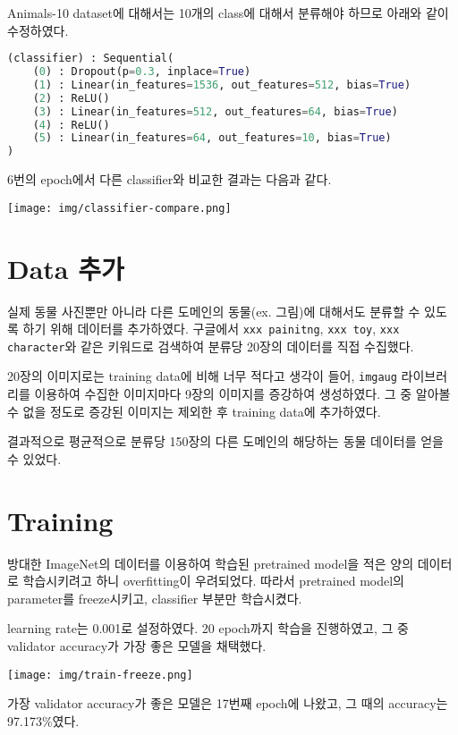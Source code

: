 Animals-10 dataset에 대해서는 10개의 class에 대해서 분류해야 하므로 아래와 같이 수정하였다.
\begin{lstlisting}[language=Python]
(classifier) : Sequential(
    (0) : Dropout(p=0.3, inplace=True)
    (1) : Linear(in_features=1536, out_features=512, bias=True)
    (2) : ReLU()
    (3) : Linear(in_features=512, out_features=64, bias=True)
    (4) : ReLU()
    (5) : Linear(in_features=64, out_features=10, bias=True)
) 
\end{lstlisting}

6번의 epoch에서 다른 classifier와 비교한 결과는 다음과 같다.
\begin{center}
    \texttt{[image: img/classifier-compare.png]}
\end{center}

\section{Data 추가}

실제 동물 사진뿐만 아니라 다른 도메인의 동물(ex. 그림)에 대해서도 분류할 수 있도록 하기 위해 데이터를 추가하였다.
구글에서 \texttt{xxx painitng}, \texttt{xxx toy}, \texttt{xxx character}와 같은 키워드로 검색하여 분류당 20장의 데이터를 직접 수집했다.

20장의 이미지로는 training data에 비해 너무 적다고 생각이 들어, 
\texttt{imgaug} 라이브러리를 이용하여 수집한 이미지마다 9장의 이미지를 증강하여 생성하였다.
그 중 알아볼 수 없을 정도로 증강된 이미지는 제외한 후 training data에 추가하였다.

결과적으로 평균적으로 분류당 150장의 다른 도메인의 해당하는 동물 데이터를 얻을 수 있었다.

\section{Training}
방대한 ImageNet의 데이터를 이용하여 학습된 pretrained model을 적은 양의 데이터로 학습시키려고 하니 overfitting이 우려되었다.
따라서 pretrained model의 parameter를 freeze시키고, classifier 부분만 학습시켰다.

learning rate는 0.001로 설정하였다. 
20 epoch까지 학습을 진행하였고, 그 중 validator accuracy가 가장 좋은 모델을 채택했다.
\begin{center}
    \texttt{[image: img/train-freeze.png]}
\end{center}
가장 validator accuracy가 좋은 모델은 17번째 epoch에 나왔고, 그 때의 accuracy는 97.173\%였다.

